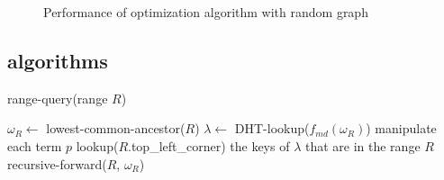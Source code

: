 \begin{figure}[!ht]
  \begin{center}
  \end{center}%
  \caption{Performance of optimization algorithm with random graph}\label{fig:complex}\vspace{-0.10in}
\end{figure}
\fi

\subsection{algorithms}
\begin{algorithm}[h]
\caption{range-query(range $R$)}\small \label{alg:rangequery}
\begin{algorithmic}[1]
  \boldnext\State $\omega_R\leftarrow $ lowest-common-ancestor($R$) 
  \State $\lambda\leftarrow $ DHT-lookup($f_{md}(\omega_R)$)
   
    \State manipulate each term $p$
  \EndFor
      \State \Return lookup($R$.top\_left\_corner)
      \State \Return the keys of $\lambda$ that are in the range $R$
  \Else
      \State \Return recursive-forward($R$, $\omega_R$)
  \EndIf
\end{algorithmic}
\end{algorithm}

